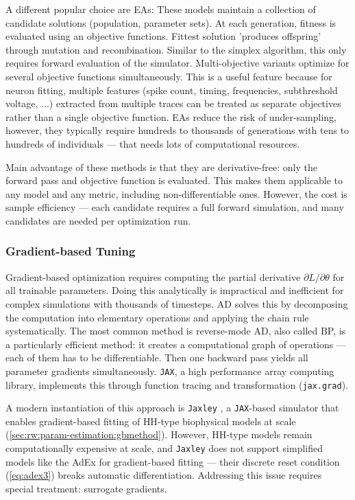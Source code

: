A different popular choice are \glspl{EA}:
These models maintain a collection of candidate solutions (population, parameter sets).
At each generation, fitness is evaluated using an objective functions.
Fittest solution 'produces offspring' through mutation and recombination.
Similar to the simplex algorithm, this only requires forward evaluation of the simulator.
Multi-objective variants optimize for several objective functions simultaneously.
This is a useful feature because for neuron fitting, multiple features (spike count, timing, frequencies, subthreshold voltage, ...) extracted from multiple traces can be treated as separate objectives rather than a single objective function.
\glspl{EA} reduce the risk of under-sampling, however, they typically require hundreds to thousands of generations with tens to hundreds of individuals --- that needs lots of computational resources.

Main advantage of these methods is that they are derivative-free: only the forward pass and objective function is evaluated.
This makes them applicable to any model and any metric, including non-differentiable ones.
However, the cost is sample efficiency — each candidate requires a full forward simulation, and many candidates are needed per optimization run.

\subsubsection{Gradient-based Tuning}\label{sec:bg:tuning:gradient-based}
Gradient-based optimization requires computing the partial derivative $\partial L / \partial \theta$ for all trainable parameters.
Doing this analytically is impractical and inefficient for complex simulations with thousands of timesteps.
\gls{AD} solves this by decomposing the computation into elementary operations and applying the chain rule systematically.
The most common method is reverse-mode \gls{AD}, also called \gls{BP}, is a particularly efficient method:
it creates a computational graph of operations --- each of them has to be differentiable.
Then one backward pass yields all parameter gradients simultaneously.
\texttt{JAX}, a high performance array computing library, implements this through function tracing and transformation (\verb|jax.grad|).

A modern instantiation of this approach is \texttt{Jaxley} \cite{Deistler2025}, a \texttt{JAX}-based simulator that enables gradient-based fitting of \gls{HH}-type biophysical models at scale (\cref{sec:rw:param-estimation:gbmethod}).
However, \gls{HH}-type models remain computationally expensive at scale, and \texttt{Jaxley} does not support simplified models like the \gls{AdEx} for gradient-based fitting --- their discrete reset condition (\cref{eq:adex3}) breaks automatic differentiation.
Addressing this issue requires special treatment: surrogate gradients.

